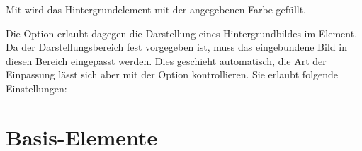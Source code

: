 \documentclass[a4paper,11pt]{tubsreprt}
\begin{document}
Mit  wird das Hintergrundelement mit der angegebenen
Farbe gefüllt.

Die Option  erlaubt dagegen die Darstellung
eines Hintergrundbildes im Element.
Da der Darstellungsbereich fest vorgegeben ist, muss das eingebundene Bild
in diesen Bereich eingepasst werden. Dies geschieht automatisch, die Art
der Einpassung lässt sich aber mit der Option  kontrollieren.
Sie erlaubt folgende Einstellungen:


\begin{desctable}
\end{desctable}

\part{Basis-Elemente}




\end{document}
